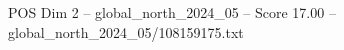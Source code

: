 \begin{textsample}{POS Dim 2 – global\_north\_2024\_05 – Score 17.00 – global\_north\_2024\_05/108159175.txt}
\end{textsample}
